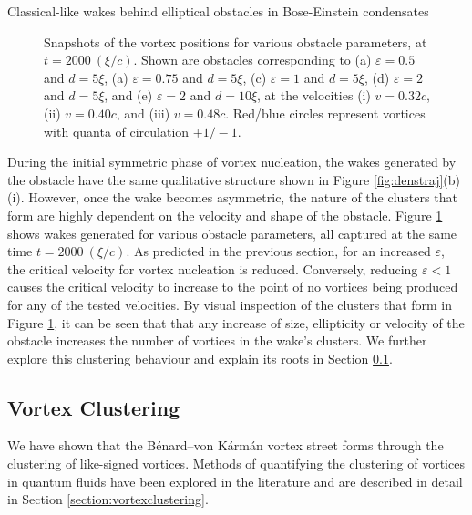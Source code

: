 \begin{chapter}{\label{cha:wake}Classical-like wakes behind elliptical obstacles in Bose-Einstein condensates}
\begin{figure}
\begin{center}
\begin{minipage}{0.33\linewidth}
%
\end{minipage}%
\end{center}
\caption{\label{fig:3x3grid}Snapshots of the vortex positions for various obstacle parameters, at $t=2000~(\xi/c)$. Shown are obstacles corresponding to (a) $\varepsilon=0.5$ and $d=5\xi$, (a) $\varepsilon=0.75$ and $d=5\xi$, (c) $\varepsilon=1$ and $d=5\xi$, (d) $\varepsilon=2$ and $d=5\xi$, and (e) $\varepsilon=2$ and $d=10\xi$, at the velocities (i) $v=0.32c$, (ii) $v=0.40c$, and (iii) $v=0.48c$.  Red/blue circles represent vortices with quanta of circulation $+1/-1$.}
\end{figure}
During the initial symmetric phase of vortex nucleation, the wakes generated by the obstacle have the same qualitative structure shown in Figure \ref{fig:denstraj}(b) (i).  However, once the wake becomes asymmetric, the nature of the clusters that form are highly dependent on the velocity and shape of the obstacle. Figure \ref{fig:3x3grid} shows wakes generated for various obstacle parameters, all captured at the same time $t=2000~(\xi/c)$. As predicted in the previous section, for an increased $\varepsilon$, the critical velocity for vortex nucleation is reduced. Conversely, reducing $\varepsilon<1$ causes the critical velocity to increase to the point of no vortices being produced for any of the tested velocities. By visual inspection of the clusters that form in Figure \ref{fig:3x3grid}, it can be seen that that any increase of size, ellipticity or velocity of the obstacle increases the number of vortices in the wake's clusters. We further explore this clustering behaviour and explain its roots in Section \ref{sec:clusteringwake}.

\subsection{Vortex Clustering}\label{sec:clusteringwake}
We have shown that the B\'enard--von K\'arm\'an vortex street forms through the clustering of like-signed vortices. Methods of quantifying the clustering of vortices in quantum fluids have been explored in the literature \cite{white12,reeves_billam_13,bagg12} and are described in detail in Section \ref{section:vortexclustering}.


\end{chapter}
